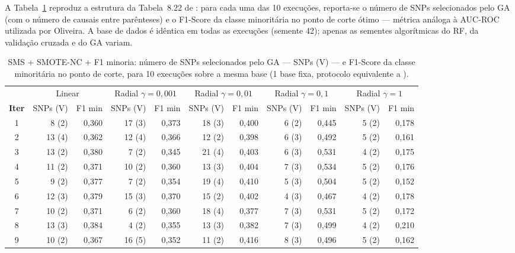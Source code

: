 \documentclass[
    12pt,
    a4paper,
    oneside,
    english,
    french,
    spanish,
    brazil
    ]{abntex2}
\renewcommand{\arraystretch}{1.3}
\newcommand{\novo}[1]{\textcolor{corNova}{#1}}
\begin{document}
\novo{A Tabela~\ref{tab:sim6_equivalente_oliveira} reproduz a estrutura da Tabela~8.22 de \citeonline{Oliveira2015}: para cada uma das 10 execuções, reporta-se o número de SNPs selecionados pelo GA (com o número de causais entre parênteses) e o F1-Score da classe minoritária no ponto de corte ótimo --- métrica análoga à AUC-ROC utilizada por Oliveira. A base de dados é idêntica em todas as execuções (semente 42); apenas as sementes algorítmicas do RF, da validação cruzada e do GA variam.}

\begin{table}[H]
\centering
\caption{\novo{SMS + SMOTE-NC + F1 minoria: número de SNPs selecionados pelo GA --- SNPs (V) --- e F1-Score da classe minoritária no ponto de corte, para 10 execuções sobre a mesma base (1 base fixa, protocolo equivalente a \citeonline{Oliveira2015}).}}
\label{tab:sim6_equivalente_oliveira}
\small
\renewcommand{\arraystretch}{1.3}
\begin{tabular}{c|rr|rr|rr|rr|rr}
\hline
 & \multicolumn{2}{c|}{Linear} & \multicolumn{2}{c|}{Radial $\gamma=0{,}001$} & \multicolumn{2}{c|}{Radial $\gamma=0{,}01$} & \multicolumn{2}{c|}{Radial $\gamma=0{,}1$} & \multicolumn{2}{c}{Radial $\gamma=1$} \\
\textbf{Iter} & SNPs (V) & F1 min & SNPs (V) & F1 min & SNPs (V) & F1 min & SNPs (V) & F1 min & SNPs (V) & F1 min \\
\hline
 1 &  8 (2) & 0,360 & 17 (3) & 0,373 & 18 (3) & 0,400 &  6 (2) & 0,445 &  5 (2) & 0,178 \\
 2 & 13 (4) & 0,362 & 12 (4) & 0,366 & 12 (2) & 0,398 &  6 (3) & 0,492 &  5 (2) & 0,161 \\
 3 & 13 (2) & 0,380 &  7 (2) & 0,345 & 21 (4) & 0,403 &  6 (3) & 0,531 &  4 (2) & 0,175 \\
 4 & 11 (2) & 0,371 & 10 (2) & 0,360 & 13 (3) & 0,404 &  7 (3) & 0,534 &  5 (2) & 0,176 \\
 5 &  9 (2) & 0,377 &  7 (2) & 0,354 & 19 (4) & 0,410 &  5 (3) & 0,504 &  5 (2) & 0,152 \\
 6 & 12 (3) & 0,379 & 15 (3) & 0,370 & 15 (2) & 0,402 &  4 (3) & 0,467 &  4 (2) & 0,178 \\
 7 & 10 (2) & 0,371 &  6 (2) & 0,360 & 18 (4) & 0,377 &  7 (3) & 0,531 &  5 (2) & 0,172 \\
 8 & 13 (3) & 0,384 &  4 (2) & 0,355 & 13 (3) & 0,382 &  7 (3) & 0,499 &  4 (2) & 0,210 \\
 9 & 10 (2) & 0,367 & 16 (5) & 0,352 & 11 (2) & 0,416 &  8 (3) & 0,496 &  5 (2) & 0,162 \\

\end{tabular}
\end{table}
\end{document}

